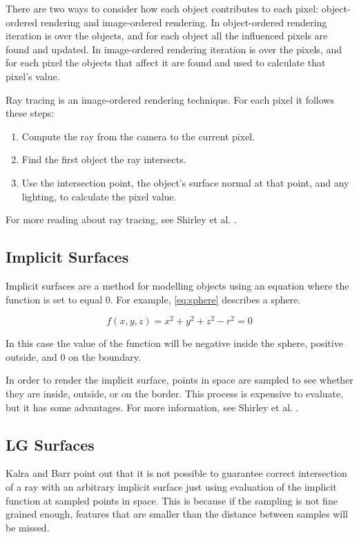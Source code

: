 \documentclass[conference]{acmsiggraph}
\begin{document}
There are two ways to consider how each object contributes to each 
pixel: object-ordered rendering and image-ordered rendering.  In
object-ordered rendering iteration is over the objects, and for
each object all the influenced pixels are found and updated.  In
image-ordered rendering iteration is over the pixels, and for each
pixel the objects that affect it are found and used to calculate
that pixel's value.

Ray tracing is an image-ordered rendering technique.  For each pixel
it follows these steps:
\begin{enumerate}
	\item Compute the ray from the camera to the current pixel.
	\item Find the first object the ray intersects.
	\item Use the intersection point, the object's surface normal at that
	point, and any lighting, to calculate the pixel value.
\end{enumerate}

For more reading about ray tracing, see Shirley et al. \cite{Shirley}.

\subsection{Implicit Surfaces}

Implicit surfaces are a method for modelling objects using an equation
where the function is set to equal 0.  For example, \ref{eq:sphere}
describes a sphere.

\begin{equation}
\label{eq:sphere}
f(x, y, z) = x^2 + y^2 + z^2 - r^2 = 0
\end{equation}

In this case the value of the function will be negative inside the 
sphere, positive outside, and 0 on the boundary.

In order to render the implicit surface, points in space are sampled
to see whether they are inside, outside, or on the border.  This process
is expensive to evaluate, but it has some advantages.  For more information,
see Shirley et al. \cite{Shirley}.

\subsection{LG Surfaces}
\label{sec:LGSurfaces}

Kalra and Barr \cite{KalraBarr1989} point out that it is not possible to
guarantee correct intersection of a ray with an arbitrary implicit surface
just using evaluation of the implicit function at sampled points in space.
This is because if the sampling is not fine grained enough, features that
are smaller than the distance between samples will be missed.
\end{document}
